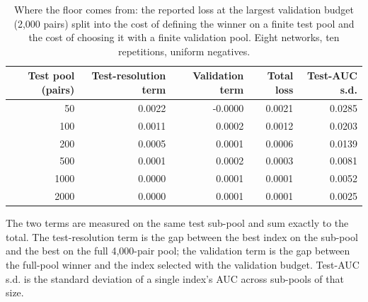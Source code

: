 \begin{table}[htbp]
\centering
\scriptsize
\caption{Where the floor comes from: the reported loss at the largest validation budget (2{,}000 pairs) split into the cost of defining the winner on a finite test pool and the cost of choosing it with a finite validation pool. Eight networks, ten repetitions, uniform negatives.}
\label{tab:testpool}
\begin{tabular}{r r r r r}
\toprule
Test pool (pairs) & Test-resolution term & Validation term & Total loss & Test-AUC s.d. \\
\midrule
50 & 0.0022 & -0.0000 & 0.0021 & 0.0285 \\
100 & 0.0011 & 0.0002 & 0.0012 & 0.0203 \\
200 & 0.0005 & 0.0001 & 0.0006 & 0.0139 \\
500 & 0.0001 & 0.0002 & 0.0003 & 0.0081 \\
1000 & 0.0000 & 0.0001 & 0.0001 & 0.0052 \\
2000 & 0.0000 & 0.0001 & 0.0001 & 0.0025 \\
\bottomrule
\end{tabular}
\par\vspace{2pt}\begin{minipage}{\linewidth}\footnotesize The two terms are measured on the same test sub-pool and sum exactly to the total. The test-resolution term is the gap between the best index on the sub-pool and the best on the full 4{,}000-pair pool; the validation term is the gap between the full-pool winner and the index selected with the validation budget. Test-AUC s.d. is the standard deviation of a single index's AUC across sub-pools of that size.\end{minipage}
\end{table}
